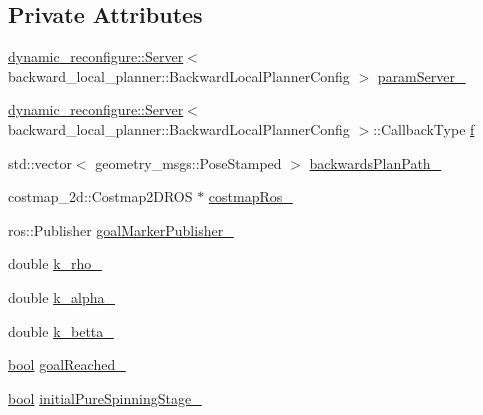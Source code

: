 \subsection*{Private Attributes}
\begin{DoxyCompactItemize}
\item 
\hyperlink{sm__radial__motion_2test_2tool__action__server_2src_2tool__action__server__node_8cpp_ab5d66ae48b02f831fb527e5260ce1ed2}{dynamic\+\_\+reconfigure\+::\+Server}$<$ backward\+\_\+local\+\_\+planner\+::\+Backward\+Local\+Planner\+Config $>$ \hyperlink{classbackward__local__planner_1_1BackwardLocalPlanner_a953b593550c975f1c9caf0ed0c3143a5}{param\+Server\+\_\+}
\item 
\hyperlink{sm__radial__motion_2test_2tool__action__server_2src_2tool__action__server__node_8cpp_ab5d66ae48b02f831fb527e5260ce1ed2}{dynamic\+\_\+reconfigure\+::\+Server}$<$ backward\+\_\+local\+\_\+planner\+::\+Backward\+Local\+Planner\+Config $>$\+::Callback\+Type \hyperlink{classbackward__local__planner_1_1BackwardLocalPlanner_a6ef8d7b45a368abb6561ffd76f46f098}{f}
\item 
std\+::vector$<$ geometry\+\_\+msgs\+::\+Pose\+Stamped $>$ \hyperlink{classbackward__local__planner_1_1BackwardLocalPlanner_aaa37c16e1735cb440986b3d41e6ef8e6}{backwards\+Plan\+Path\+\_\+}
\item 
costmap\+\_\+2d\+::\+Costmap2\+D\+R\+OS $\ast$ \hyperlink{classbackward__local__planner_1_1BackwardLocalPlanner_a0d1ac7384b0b241f4b77a0490165430a}{costmap\+Ros\+\_\+}
\item 
ros\+::\+Publisher \hyperlink{classbackward__local__planner_1_1BackwardLocalPlanner_aec215b9441f9ac359ea6a531339ac4f8}{goal\+Marker\+Publisher\+\_\+}
\item 
double \hyperlink{classbackward__local__planner_1_1BackwardLocalPlanner_a4060acf69c2590984eb87d8e04a82699}{k\+\_\+rho\+\_\+}
\item 
double \hyperlink{classbackward__local__planner_1_1BackwardLocalPlanner_ab8a4ea2b7fe9f21c07acac7121d4dd3e}{k\+\_\+alpha\+\_\+}
\item 
double \hyperlink{classbackward__local__planner_1_1BackwardLocalPlanner_a655def0b0657ac145737cd72229ad82a}{k\+\_\+betta\+\_\+}
\item 
\hyperlink{classbool}{bool} \hyperlink{classbackward__local__planner_1_1BackwardLocalPlanner_a42fdfaf0d3eb1edb71a225ec7caf62d0}{goal\+Reached\+\_\+}
\item 
\hyperlink{classbool}{bool} \hyperlink{classbackward__local__planner_1_1BackwardLocalPlanner_ae03594253808527b547901baa5480d41}{initial\+Pure\+Spinning\+Stage\+\_\+}

\end{DoxyCompactItemize}
